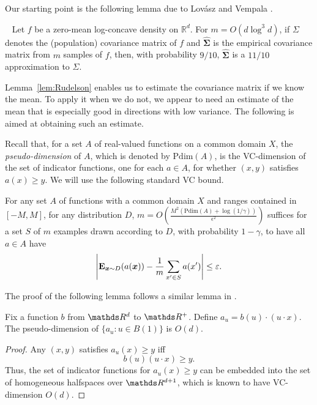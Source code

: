 Our starting point is the
following lemma due to 
Lov{\'{a}}sz and Vempala \cite{LovaszVempala07}.
\begin{lemma}~\label{lem:Rudelson}
Let $f$ be a zero-mean log-concave density on $\mathbb{R}^d$.  For $m
= O(d \log^3 d)$, if $\Sigma$ denotes the (population) covariance
matrix of $f$ and $\hat{\mathbf{\Sigma}}$ is the empirical covariance matrix
from $m$ samples of $f$, then, with probability $9/10$,
$\hat{\mathbf{\Sigma}}$ is a $11/10$ approximation to $\Sigma$.
\end{lemma}

Lemma~\ref{lem:Rudelson} enables us to estimate the covariance
matrix if we know the mean.  To apply it when we do not, we appear
to need an estimate of the mean that is especially good in
directions with low variance.  The following is aimed at obtaining such an estimate.

Recall that, for a set $A$ of real-valued functions on a common domain
$X$, the {\em pseudo-dimension} of $A$,
which is denoted by $\mathrm{Pdim}(A)$,
is the VC-dimension of the set
of indicator functions, one for each $a \in A$, for whether
$(x,y)$ satisfies $a(x) \geq y$.
We will use the following standard VC bound.
\begin{lemma}
\label{l:vc}
For any set $A$ of functions with a common domain $X$ and ranges
contained in $[-M,M]$, for any distribution $D$, 
$m = O(\frac{M^2( \mathrm{Pdim}(A) + \log(1/\gamma))}{\epsilon^2})$
suffices for a set $S$ of $m$ examples 
drawn according to $D$, with probability $1-\gamma$, 
to have all $a \in A$ have 
\[
\left| \operatorname{{\bf E}}_{\boldsymbol{x} \sim D}(a(\boldsymbol{x})) - \frac{1}{m} \sum_{x' \in S} a(x') \right|
\leq \varepsilon.
\]
\end{lemma}

The proof of the following lemma follows a similar lemma in \citep{KLS:09jmlr}.
\begin{lemma}
\label{l:pdim.mean}
Fix 
a function $b$ from
$\R^d$ to $\R^+$.  Define $a_u = b(u) \cdot (u \cdot x)$.
The pseudo-dimension of $\{ a_u : u \in B(1) \}$ is $O(d)$.
\end{lemma}
\begin{proof} Any $(x,y)$ satisfies 
$a_u(x) \geq y$ iff
\[
b(u) (u \cdot x) \geq y.
\]
Thus, the set of indicator functions
for $a_u(x) \geq y$ can be embedded into the set of homogeneous halfspaces
over $\R^{d+1}$, which is known to have VC-dimension $O(d).$
\end{proof}

